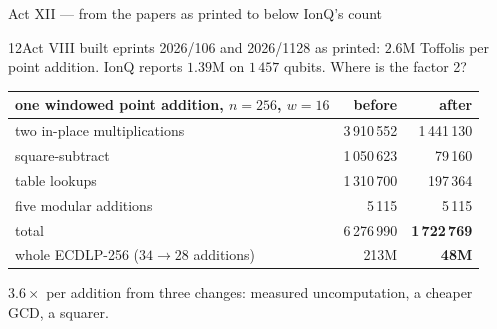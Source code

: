 \documentclass[aspectratio=169,11pt]{beamer}
\begin{document}
\setcounter{framenumber}{163}
\begin{frame}{Act XII --- from the papers as printed to below IonQ's count}
  \begin{difficulty}{12}Act VIII built eprints 2026/106 and 2026/1128 as printed: $2.6$M Toffolis per point addition. IonQ reports $1.39$M on $1\,457$ qubits. Where is the factor 2?\end{difficulty}
  \centering\small
  \renewcommand{\arraystretch}{1.05}
  \begin{tabular}{@{}lrr@{}}
    \toprule
    one windowed point addition, $n=256$, $w=16$ & before & after \\
    \midrule
    two in-place multiplications & 3\,910\,552 & 1\,441\,130 \\
    square-subtract & 1\,050\,623 & 79\,160 \\
    table lookups & 1\,310\,700 & 197\,364 \\
    five modular additions & 5\,115 & 5\,115 \\
    \midrule
    total & 6\,276\,990 & \textbf{1\,722\,769} \\
    whole ECDLP-256 ($34\to28$ additions) & 213M & \textbf{48M} \\
    \bottomrule
  \end{tabular}
  \begin{takeaway}$3.6\times$ per addition from three changes: measured uncomputation, a cheaper GCD, a squarer.\end{takeaway}
\end{frame}
\end{document}
